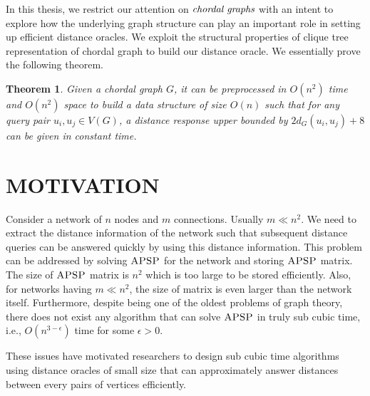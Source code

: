 \documentclass[MS,synopsis]{iitmdiss}
\newtheorem{theorem}{Theorem}
\begin{document}
 In this thesis, we restrict our attention on $\emph{chordal graphs}$ with an intent to explore
 how the underlying graph structure can play an important role in setting up efficient distance oracles.
 We exploit the structural properties of clique tree representation of chordal graph to build our distance oracle. 
 We essentially prove the following theorem.
 \pagebreak
 
 \begin{theorem}\label{maintheorem}
 Given a chordal graph $G$, it can be preprocessed in $O(n^2)$ time and $O(n^2)$ space to build a data structure of size $O(n)$
 such that for any query pair $u_i,u_j \in V(G)$, a distance response upper bounded by $2d_G(u_i,u_j)+8$ can be given in constant time.
 \end{theorem}
 

 \section{MOTIVATION}

 Consider a network of $n$ nodes and $m$ connections. Usually $m \ll n^2$. We need to extract the distance information of the network such that
 subsequent distance queries can be answered quickly by using this distance information. This problem can be addressed by solving $\textsc{APSP}$
 for the network and storing $\textsc{APSP}$ matrix. The size of $\textsc{APSP}$ matrix is $n^2$ which is too large to be stored 
 efficiently. Also, for networks having $m \ll n^2$, the size of matrix is even larger than the network itself. 
 Furthermore, despite being one of the oldest problems of graph theory, there does not exist any algorithm that
 can solve $\textsc{APSP}$ in truly sub cubic time, i.e., $O(n^{3-\epsilon})$ time for some $\epsilon > 0$.
 
 These issues have motivated researchers to design sub cubic time algorithms using distance oracles of small size that can 
 approximately answer distances between every pairs of vertices efficiently.
 
 
\end{document}
